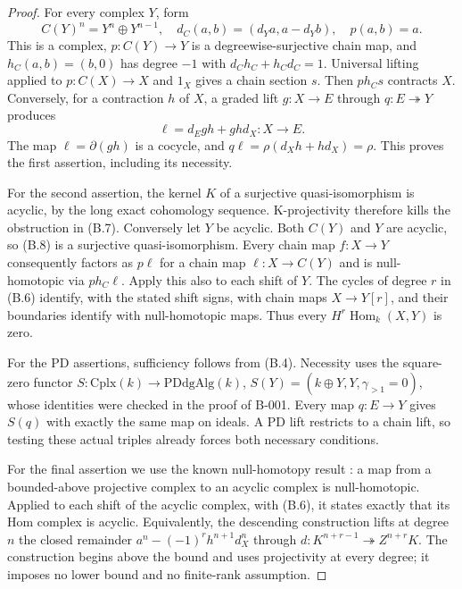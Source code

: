 \begin{proof}
For every complex $Y$, form
\[
C(Y)^n=Y^n\oplus Y^{n-1},\quad
d_C(a,b)=(d_Ya,a-d_Yb),\quad p(a,b)=a.                           \tag{B.8}
\]
This is a complex, $p:C(Y)\to Y$ is a degreewise-surjective chain map,
and $h_C(a,b)=(b,0)$ has degree $-1$ with $d_Ch_C+h_Cd_C=1$.
Universal lifting applied to $p:C(X)\to X$ and $1_X$ gives a chain
section $s$.  Then $ph_Cs$ contracts $X$.
Conversely, for a contraction $h$ of $X$, a graded lift $g:X\to E$
through $q:E\twoheadrightarrow Y$ produces
\[
\ell=d_Egh+ghd_X:X\longrightarrow E.
\]
The map $\ell=\partial(gh)$ is a cocycle, and
$q\ell=\rho(d_Xh+hd_X)=\rho$.  This proves the first assertion,
including its necessity.

For the second assertion, the kernel $K$ of a surjective
quasi-isomorphism is acyclic, by the long exact cohomology sequence.
K-projectivity therefore kills the obstruction in \textup{(B.7)}.
Conversely let $Y$ be acyclic.  Both $C(Y)$ and $Y$ are acyclic,
so \textup{(B.8)} is a surjective quasi-isomorphism.  Every chain map
$f:X\to Y$ consequently factors as $p\ell$ for a chain map
$\ell:X\to C(Y)$ and is null-homotopic via $ph_C\ell$.
Apply this also to each shift of $Y$.  The cycles of degree $r$ in
\textup{(B.6)} identify, with the stated shift signs, with chain maps
$X\to Y[r]$, and their boundaries identify with null-homotopic maps.
Thus every $H^r\operatorname{Hom}_k(X,Y)$ is zero.

For the PD assertions, sufficiency follows from \textup{(B.4)}.
Necessity uses the square-zero functor
$S:\mathrm{Cplx}(k)\to\mathrm{PDdgAlg}(k)$,
$S(Y)=(k\oplus Y,Y,\gamma_{>1}=0)$, whose identities were checked
in the proof of B-001.  Every map $q:E\to Y$ gives $S(q)$ with exactly
the same map on ideals.  A PD lift restricts to a chain lift, so testing
these actual triples already forces both necessary conditions.

For the final assertion we use the known null-homotopy result
\cite[Lemma 13.19.4]{B_StacksProjective}: a map from a bounded-above
projective complex to an acyclic complex is null-homotopic.  Applied
to each shift of the acyclic complex, with \textup{(B.6)}, it states
exactly that its Hom complex is acyclic.  Equivalently, the descending
construction lifts at degree $n$ the closed remainder
$a^n-(-1)^r h^{n+1}d_X^n$ through
$d:K^{n+r-1}\twoheadrightarrow Z^{n+r}K$.
The construction begins above the bound and uses projectivity at every
degree; it imposes no lower bound and no finite-rank assumption.
\end{proof}

